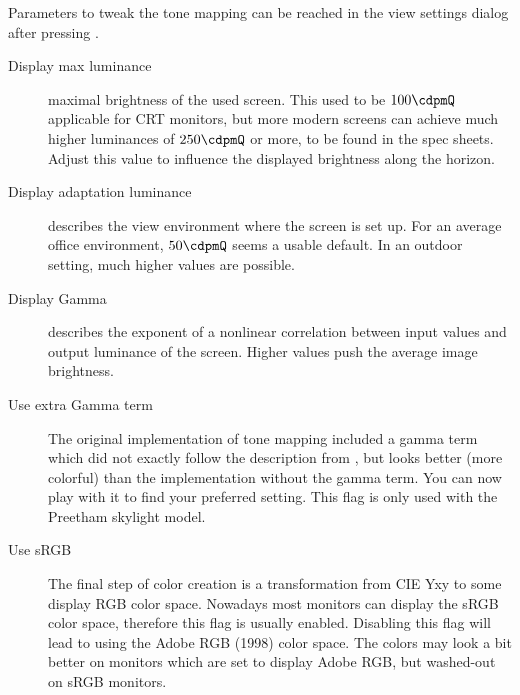 Parameters to tweak the tone mapping can be reached in the view
settings dialog after pressing .

\begin{description}
\item[Display max luminance] maximal brightness of the used
  screen. This used to be $100 \cdpmQ$ applicable for CRT monitors,
  but more modern screens can achieve much higher luminances of $250
  \cdpmQ$ or more, to be found in the spec sheets. Adjust this value
  to influence the displayed brightness along the horizon.
\item[Display adaptation luminance] describes the view environment
  where the screen is set up. For an average office environment,
  $50 \cdpmQ$ seems a usable default. In an outdoor setting, much
  higher values are possible.
\item[Display Gamma] describes the exponent of a nonlinear correlation
  between input values and output luminance of the screen. Higher
  values push the average image brightness.
\item[Use extra Gamma term] The original implementation of tone
  mapping included a gamma term which did not exactly follow the
  description from \citet{Larson:1997}, but looks better (more
  colorful) than the implementation without the gamma term. You can
  now play with it to find your preferred setting. This flag is only
  used with the Preetham skylight model.
\item[Use sRGB] The final step of color creation is a transformation
  from CIE Yxy to some display RGB color space. Nowadays most monitors
  can display the sRGB color space, therefore this flag is usually
  enabled. Disabling this flag will lead to using the Adobe RGB
  (1998) color space. The colors may look a bit better on monitors
  which are set to display Adobe RGB, but washed-out on sRGB monitors.
\end{description}



